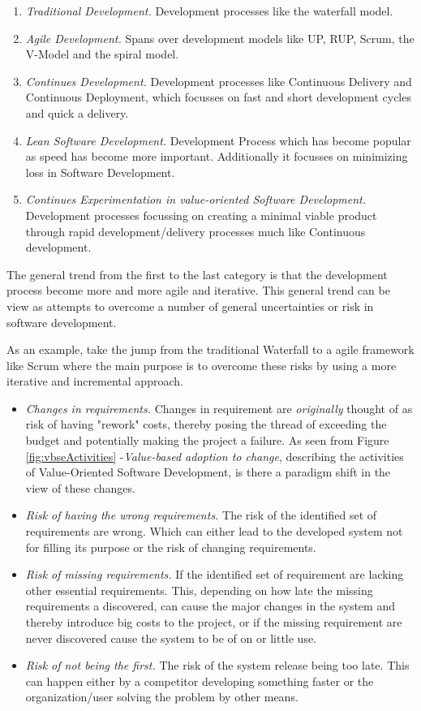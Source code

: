 \documentclass{sig-alternate}
\begin{document}
\begin{enumerate}
\item \textit{Traditional Development.} Development processes like the waterfall model.
\item \textit{Agile Development.} Spans over development models like UP, RUP, Scrum, the V-Model and the spiral model.
\item \textit{Continues Development.} Development processes like Continuous Delivery and Continuous Deployment, which focusses on fast and short development cycles and quick a delivery.
\item \textit{Lean Software Development.} Development Process which has become popular as speed has become more important. Additionally it focusses on minimizing loss in Software Development.
\item \textit{Continues Experimentation in value-oriented Software Development.} Development processes focussing on creating a minimal viable product through rapid development/delivery processes much like Continuous development.
\end{enumerate}

The general trend from the first to the last category is that the development process become more and more agile and iterative. This general trend can be view as attempts to overcome a number of general uncertainties or risk in software development.

As an example, take the jump from the traditional Waterfall to a agile framework like Scrum where the main purpose is to overcome these risks by using a more iterative and incremental approach\cite{sutherland:scrum}.

\begin{itemize}
\item \textit{Changes in requirements.} Changes in requirement are \textit{originally} thought of as risk of having "rework" costs, thereby posing the thread of exceeding the budget and potentially making the project a failure. As seen from Figure \ref{fig:vbseActivities} -\textit{Value-based adoption to change}, describing the activities of Value-Oriented Software Development, is there a paradigm shift in the view of these changes.
\item \textit{Risk of having the wrong requirements.} The risk of the identified set of requirements are wrong. Which can either lead to the developed system not for filling its purpose or the risk of changing requirements.
\item \textit{Risk of missing requirements.} If the identified set of requirement are lacking other essential requirements. This, depending on how late the missing requirements a discovered, can cause the major changes in the system and thereby introduce big costs to the project, or if the missing requirement are never discovered cause the system to be of on or little use.
\item \textit{Risk of not being the first.} The risk of the system release being too late. This can happen either by a competitor developing something faster or the organization/user solving the problem by other means.
\end{itemize}
\end{document}
